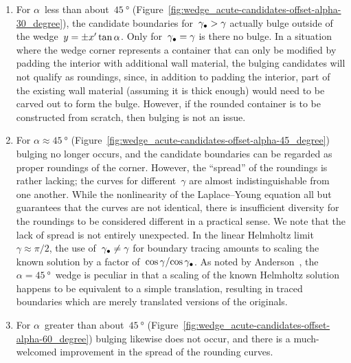 \begin{enumerate}
  \item
    For $\alpha$~less than about~$\SI{45}{\degree}$
    (Figure~\ref{fig:wedge_acute-candidates-offset-alpha-30_degree}),
    the candidate boundaries for~$\gamma_\bullet > \gamma$
    actually bulge outside of the wedge~$y = \pm x' \tan\alpha$.
    Only for~$\gamma_\bullet = \gamma$ is there no bulge.
    In a situation where the wedge corner represents a container
    that can only be modified by padding the interior
    with additional wall material,
    the bulging candidates will not qualify as roundings,
    since, in addition to padding the interior,
    part of the existing wall material
    (assuming it is thick enough)
    would need to be carved out to form the bulge.
    However, if the rounded container is to be constructed from scratch,
    then bulging is not an issue.
  \item
    For $\alpha \approx \SI{45}{\degree}$
    (Figure~\ref{fig:wedge_acute-candidates-offset-alpha-45_degree})
    bulging no longer occurs,
    and the candidate boundaries can be regarded
    as proper roundings of the corner.
    However, the ``spread'' of the roundings is rather lacking;
    the curves for different~$\gamma$ are almost indistinguishable
    from one another.
    While the nonlinearity of the Laplace--Young equation all but guarantees
    that the curves are not identical,
    there is insufficient diversity
    for the roundings to be considered different in a practical sense.
    We note that the lack of spread is not entirely unexpected.
    In the linear Helmholtz limit~$\gamma \approx \pi/2$,
    the use of~$\gamma_\bullet \ne \gamma$ for boundary tracing
    amounts to scaling the known solution
    by a factor of~$\cos\gamma / {\cos\gamma_\bullet}$.
    As noted by Anderson~\cite[(7.8)]{
      anderson-2002-thesis-boundary-tracing-pdes
    },
    the $\alpha = \SI{45}{\degree}$~wedge is peculiar
    in that a scaling of the known Helmholtz solution
    happens to be equivalent to a simple translation,
    resulting in traced boundaries which are merely translated versions
    of the originals.
  \item
    For $\alpha$~greater than about~$\SI{45}{\degree}$
    (Figure~\ref{fig:wedge_acute-candidates-offset-alpha-60_degree})
    bulging likewise does not occur,
    and there is a much-welcomed improvement
    in the spread of the rounding curves.
\end{enumerate}

\begin{figure}
\end{figure}

